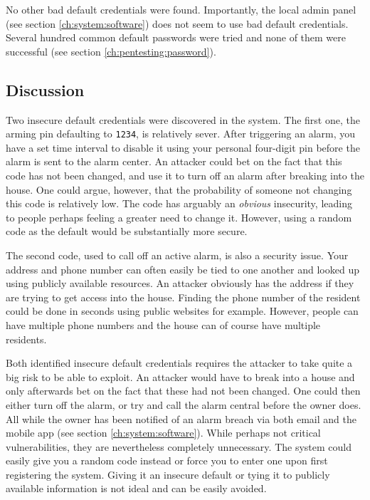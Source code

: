 No other bad default credentials were found. Importantly, the local admin panel (see section \ref{ch:system:software}) does not seem to use bad default credentials. Several hundred common default passwords were tried and none of them were successful (see section \ref{ch:pentesting:password}).

\subsection{Discussion}
Two insecure default credentials were discovered in the system. The first one, the arming pin defaulting to \texttt{1234}, is relatively sever. After triggering an alarm, you have a set time interval to disable it using your personal four-digit pin before the alarm is sent to the alarm center. An attacker could bet on the fact that this code has not been changed, and use it to turn off an alarm after breaking into the house. One could argue, however, that the probability of someone not changing this code is relatively low. The code has arguably an \textit{obvious} insecurity, leading to people perhaps feeling a greater need to change it. However, using a random code as the default would be substantially more secure.

The second code, used to call off an active alarm, is also a security issue. Your address and phone number can often easily be tied to one another and looked up using publicly available resources. An attacker obviously has the address if they are trying to get access into the house. Finding the phone number of the resident could be done in seconds using public websites for example. However, people can have multiple phone numbers and the house can of course have multiple residents.

Both identified insecure default credentials requires the attacker to take quite a big risk to be able to exploit. An attacker would have to break into a house and only afterwards bet on the fact that these had not been changed. One could then either turn off the alarm, or try and call the alarm central before the owner does. All while the owner has been notified of an alarm breach via both email and the mobile app (see section \ref{ch:system:software}). While perhaps not critical vulnerabilities, they are nevertheless completely unnecessary. The system could easily give you a random code instead or force you to enter one upon first registering the system. Giving it an insecure default or tying it to publicly available information is not ideal and can be easily avoided.
